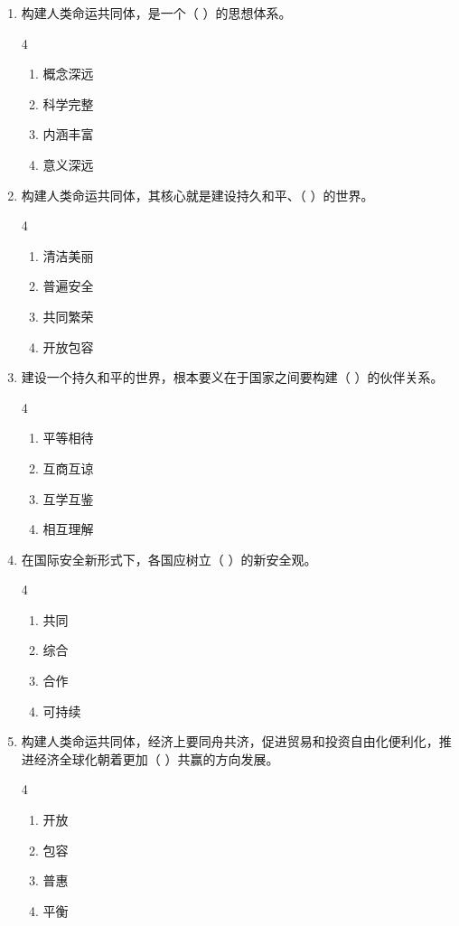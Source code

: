 \documentclass[a4paper,11pt]{ctexart}
\begin{document}
\begin{enumerate}
    \item 构建人类命运共同体，是一个（ ）的思想体系。
    \begin{multicols}{4}
    \begin{enumerate}
        \item 概念深远
        \item 科学完整
        \item 内涵丰富
        \item 意义深远
    \end{enumerate}
    \end{multicols}

    \item 构建人类命运共同体，其核心就是建设持久和平、（ ）的世界。
    \begin{multicols}{4}
    \begin{enumerate}
        \item 清洁美丽
        \item 普遍安全
        \item 共同繁荣
        \item 开放包容
    \end{enumerate}
    \end{multicols}

    \item 建设一个持久和平的世界，根本要义在于国家之间要构建（ ）的伙伴关系。
    \begin{multicols}{4}
    \begin{enumerate}
        \item 平等相待
        \item 互商互谅
        \item 互学互鉴
        \item 相互理解
    \end{enumerate}
    \end{multicols}

    \item 在国际安全新形式下，各国应树立（ ）的新安全观。
    \begin{multicols}{4}
    \begin{enumerate}
        \item 共同
        \item 综合
        \item 合作
        \item 可持续
    \end{enumerate}
    \end{multicols}

    \item 构建人类命运共同体，经济上要同舟共济，促进贸易和投资自由化便利化，推进经济全球化朝着更加（ ）共赢的方向发展。
    \begin{multicols}{4}
    \begin{enumerate}
        \item 开放
        \item 包容
        \item 普惠
        \item 平衡
    \end{enumerate}
    \end{multicols}


\end{enumerate}
\end{document}
